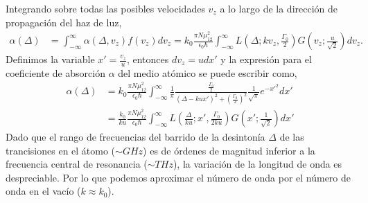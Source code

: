Integrando sobre todas las posibles velocidades $v_z$ a lo largo de la dirección de propagación del haz de luz,
\begin{equation}
    \begin{split}
        \alpha(\Delta) &= \int_{-\infty}^{\infty} \alpha(\Delta, v_z) f(v_z) dv_z = k_0 \frac{\pi N \mu_{12}^2}{\epsilon_0 \hbar} \int_{-\infty}^{\infty} L\left(\Delta; k v_z, \frac{\Gamma_0}{2}\right) G \left(v_z;\frac{u}{\sqrt{2}}\right) dv_z.
    \end{split}
\end{equation}
Definimos la variable $x' = \frac{v_z}{u}$, entonces $dv_z = u dx'$ y la expresión para el coeficiente de absorción $\alpha$ del medio atómico se puede escribir como,
\begin{equation}
    \begin{split}
        \alpha(\Delta) &= k_0 \frac{\pi N \mu_{12}^2}{\epsilon_0 \hbar} \int_{-\infty}^{\infty} \frac{1}{\pi} \frac{\frac{\Gamma_0}{2}}{(\Delta - k u x')^2 + (\frac{\Gamma_0}{2})^2} \frac{1}{\sqrt{\pi}} e^{-x'^2} dx'\\
        &= \frac{k_0}{k u} \frac{\pi N \mu_{12}^2}{\epsilon_0 \hbar} \int_{-\infty}^{\infty} L\left(\frac{\Delta}{ku}; x', \frac{\Gamma_0}{2ku}\right) G\left(x'; \frac{1}{\sqrt{2}}\right) dx'
    \end{split}
\end{equation}
Dado que el rango de frecuencias del barrido de la desintonía $\Delta$ de las trancisiones en el átomo ($\sim GHz$) es de órdenes de magnitud inferior a la frecuencia central de resonancia ($\sim THz$), la variación de la longitud de onda es despreciable. Por lo que podemos aproximar el número de onda por el número de onda en el vacío ($k \approx k_0$). 

